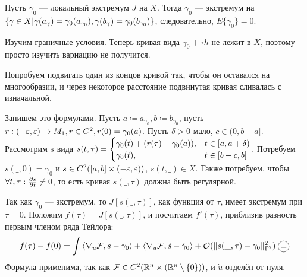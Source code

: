 \documentclass[a4paper]{article}
\begin{document}
    Пусть $\gamma_0$ --- локальный экстремум $J$ на $X$.
    Тогда $\gamma_0$ --- экстремум на $\left\{\gamma \in X\middle|\gamma(a_\gamma) = \gamma_0(a_{\gamma_0}), \gamma(b_\gamma) = \gamma_0(b_{\gamma_0})\right\}$, следовательно, $E\{\gamma_0\} = 0$.

    Изучим граничные условия.
    Теперь кривая вида $\gamma_0 + \tau h$ не лежит в $X$, поэтому просто изучить вариацию не получится.

    Попробуем подвигать один из концов кривой так, чтобы он оставался на многообразии, и через некоторое расстояние подвинутая кривая сливалась с изначальной.

    Запишем это формулами.
    Пусть $a \coloneqq a_{\gamma_0}, b \coloneqq b_{\gamma_0}$, пусть $r: (-\varepsilon, \varepsilon) \rightarrow M_1, r \in C^2, r(0) = \gamma_0(a)$.
    Пусть $\delta > 0$ мало, $c \in (0, b - a]$.
    Рассмотрим $s$ вида $s(t, \tau) = \begin{cases}\gamma_0(t) + (r(\tau) - \gamma_0(a)), & t \in [a, a + \delta) \\ \gamma_0(t),& t \in [b - c, b]\end{cases}$.
    Потребуем $s(\_, 0) = \gamma_0$ и $s \in C^2([a, b] \times (-\varepsilon, \varepsilon))$, $s(t, \_) \in X$.
    Также потребуем, чтобы $\forall t, \tau: \frac{\partial s}{\partial t} \ne 0$, то есть кривая $s(\_, \tau)$ должна быть регулярной.

    Так как $\gamma_0$ --- экстремум, то $J[s(\_, \tau)]$, как функция от $\tau$, имеет экстремум при $\tau = 0$.
    Положим $f(\tau) = J[s(\_, \tau)]$, и посчитаем $f'(\tau)$, приблизив разность первым членом ряда Тейлора:
    \[f(\tau) - f(0) = \int\angles{\nabla_u \mathcal{F}, s - \gamma_0} + \angles{\nabla_{\dot{u}}\mathcal{F}, \dot{s} - \dot{\gamma}_0} + \bigO(\|s(\_, \tau) - \gamma_0\|^2_{\Gamma^2}) \circlesign{=}\]
    Формула применима, так как $\mathcal{F} \in C^2(\mathbb{R}^n \times (\mathbb{R}^n \setminus \{0\}))$, и $\dot{u}$ отделён от нуля.
\end{document}
